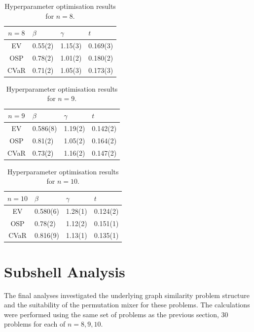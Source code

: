 \begin{table}[htbp]
    \centering
\begin{tabular}{c||l|l|l}
    $n=8$ & $\beta$ & $\gamma$ & $t$     \\\hline\hline
    EV & 0.55(2) & 1.15(3) & 0.169(3) \\\hline
    OSP & 0.78(2) & 1.01(2) & 0.180(2) \\\hline
    CVaR & 0.71(2) & 1.05(3) & 0.173(3) \\\hline
\end{tabular}
\caption{Hyperparameter optimisation results for $n=8$.}
\label{tab:n=8}
\end{table}


\begin{table}[htbp]
    \centering
\begin{tabular}{c||l|l|l}
    $n=9$ & $\beta$ & $\gamma$ & $t$     \\\hline\hline
    EV & 0.586(8) & 1.19(2) & 0.142(2) \\\hline
    OSP & 0.81(2) & 1.05(2) & 0.164(2) \\\hline
    CVaR & 0.73(2) & 1.16(2) & 0.147(2) \\\hline
\end{tabular}
\caption{Hyperparameter optimisation results for $n=9$.}
\label{tab:n=9}
\end{table}


\begin{table}[htbp]
    \centering
\begin{tabular}{c||l|l|l}
    $n=10$ & $\beta$ & $\gamma$ & $t$     \\\hline\hline
    EV & 0.580(6) & 1.28(1) & 0.124(2) \\\hline
    OSP & 0.78(2) & 1.12(2) & 0.151(1) \\\hline
    CVaR & 0.816(9) & 1.13(1) & 0.135(1) \\\hline
\end{tabular}
\caption{Hyperparameter optimisation results for $n=10$.}
\label{tab:n=10}
\end{table}


\section{Subshell Analysis}
The final analyses investigated the underlying graph similarity problem structure and the suitability of the permutation mixer for these problems. The calculations were performed using the same set of problems as the previous section, 30 problems for each of $n=8,9,10$. 

